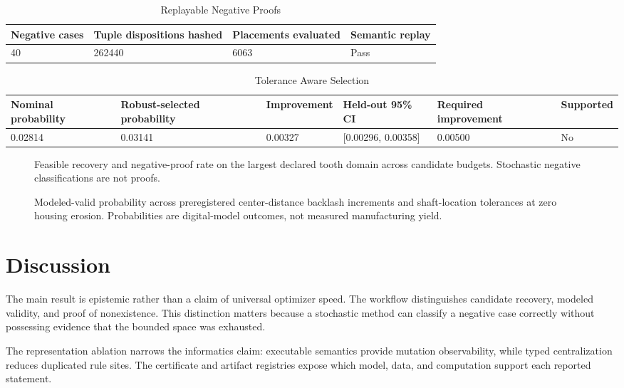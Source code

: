 \documentclass[preprint,12pt]{elsarticle}
\begin{document}
\begin{table}[htbp]
\centering
\caption{Replayable Negative Proofs}
\small
\begin{tabular}{llll}
\textbf{Negative cases} & \textbf{Tuple dispositions hashed} & \textbf{Placements evaluated} & \textbf{Semantic replay} \\
\hline
40 & 262440 & 6063 & Pass \\
\end{tabular}
\end{table}
\begin{table}[htbp]
\centering
\caption{Tolerance Aware Selection}
\small
\begin{tabular}{llllll}
\textbf{Nominal probability} & \textbf{Robust-selected probability} & \textbf{Improvement} & \textbf{Held-out 95\% CI} & \textbf{Required improvement} & \textbf{Supported} \\
\hline
0.02814 & 0.03141 & 0.00327 & [0.00296, 0.00358] & 0.00500 & No \\
\end{tabular}
\end{table}
\begin{figure}[htbp]
\centering

\caption{Feasible recovery and negative-proof rate on the largest declared tooth domain across candidate budgets. Stochastic negative classifications are not proofs.}
\end{figure}
\begin{figure}[htbp]
\centering

\caption{Modeled-valid probability across preregistered center-distance backlash increments and shaft-location tolerances at zero housing erosion. Probabilities are digital-model outcomes, not measured manufacturing yield.}
\end{figure}
\section{Discussion}
The main result is epistemic rather than a claim of universal optimizer speed. The workflow distinguishes candidate recovery, modeled validity, and proof of nonexistence. This distinction matters because a stochastic method can classify a negative case correctly without possessing evidence that the bounded space was exhausted.

The representation ablation narrows the informatics claim: executable semantics provide mutation observability, while typed centralization reduces duplicated rule sites. The certificate and artifact registries expose which model, data, and computation support each reported statement.
\end{document}
